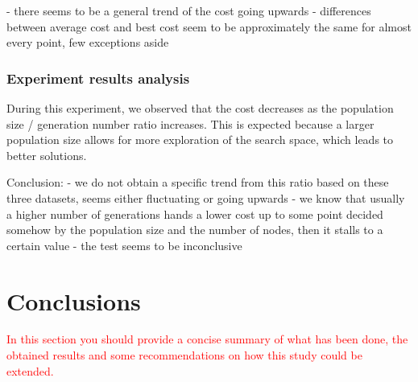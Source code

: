 \documentclass{scrartcl}
\begin{document}
- there seems to be a general trend of the cost going upwards
- differences between average cost and best cost seem to be approximately the same for almost every point, few exceptions aside

\subsubsection{Experiment results analysis}

During this experiment, we observed that the cost decreases as the population size / generation number ratio increases. This is expected because a larger population size allows for more exploration of the search space, which leads to better solutions.

Conclusion: 
- we do not obtain a specific trend from this ratio based on these three datasets, seems either fluctuating or going upwards
- we know that usually a higher number of generations hands a lower cost up to some point decided somehow by the population size and the number of nodes, then it stalls to a certain value
- the test seems to be inconclusive

\section{Conclusions}
\label{sec:conclusions}

\textcolor{red}{In this section you should provide a concise summary of what has been done, the obtained results and some recommendations on how this study could be extended.}

\lipsum[4]



\end{document}
